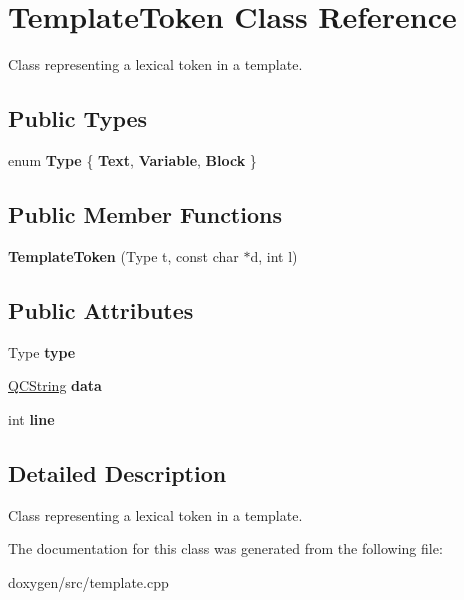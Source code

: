 \hypertarget{class_template_token}{}\section{Template\+Token Class Reference}
\label{class_template_token}


Class representing a lexical token in a template.  


\subsection*{Public Types}
\begin{DoxyCompactItemize}
\item 
\mbox{\label{class_template_token_a45cf31d317b7b01b08e7d0b471284e77}} 
enum {\bfseries Type} \{ {\bfseries Text}, 
{\bfseries Variable}, 
{\bfseries Block}
 \}
\end{DoxyCompactItemize}
\subsection*{Public Member Functions}
\begin{DoxyCompactItemize}
\item 
\mbox{\label{class_template_token_a45e8323438c1c810948f34f7033aafdf}} 
{\bfseries Template\+Token} (Type t, const char $\ast$d, int l)
\end{DoxyCompactItemize}
\subsection*{Public Attributes}
\begin{DoxyCompactItemize}
\item 
\mbox{\label{class_template_token_a470cd07c2d8ec16824e5c920a984b268}} 
Type {\bfseries type}
\item 
\mbox{\label{class_template_token_a712ae507076c9b03b88f72174a817a44}} 
\mbox{\hyperlink{class_q_c_string}{Q\+C\+String}} {\bfseries data}
\item 
\mbox{\label{class_template_token_a44271a10cbc74eea133ed9e92897012e}} 
int {\bfseries line}
\end{DoxyCompactItemize}


\subsection{Detailed Description}
Class representing a lexical token in a template. 

The documentation for this class was generated from the following file\+:\begin{DoxyCompactItemize}
\item 
doxygen/src/template.\+cpp\end{DoxyCompactItemize}
